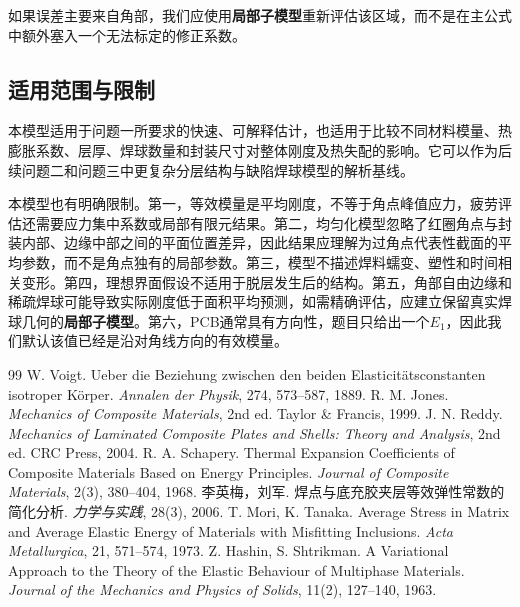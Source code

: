 \documentclass[draft,12pt,a4paper]{ctexart}
\theoremstyle{definition}
\begin{document}
如果误差主要来自角部，我们应使用\textbf{局部子模型}重新评估该区域，而不是在主公式中额外塞入一个无法标定的修正系数。

\subsection{适用范围与限制}

本模型适用于问题一所要求的快速、可解释估计，也适用于比较不同材料模量、热膨胀系数、层厚、焊球数量和封装尺寸对整体刚度及热失配的影响。它可以作为后续问题二和问题三中更复杂分层结构与缺陷焊球模型的解析基线。

本模型也有明确限制。第一，等效模量是平均刚度，不等于角点峰值应力，疲劳评估还需要应力集中系数或局部有限元结果。第二，均匀化模型忽略了红圈角点与封装内部、边缘中部之间的平面位置差异，因此结果应理解为过角点代表性截面的平均参数，而不是角点独有的局部参数。第三，模型不描述焊料蠕变、塑性和时间相关变形。第四，理想界面假设不适用于脱层发生后的结构。第五，角部自由边缘和稀疏焊球可能导致实际刚度低于面积平均预测，如需精确评估，应建立保留真实焊球几何的\textbf{局部子模型}。第六，PCB通常具有方向性，题目只给出一个$E_1$，因此我们默认该值已经是沿对角线方向的有效模量。

\newpage
{}
\begin{thebibliography}{99}
   W. Voigt. Ueber die Beziehung zwischen den beiden Elasticit\"atsconstanten isotroper K\"orper. \textit{Annalen der Physik}, 274, 573--587, 1889.
   R. M. Jones. \textit{Mechanics of Composite Materials}, 2nd ed. Taylor \& Francis, 1999.
   J. N. Reddy. \textit{Mechanics of Laminated Composite Plates and Shells: Theory and Analysis}, 2nd ed. CRC Press, 2004.
   R. A. Schapery. Thermal Expansion Coefficients of Composite Materials Based on Energy Principles. \textit{Journal of Composite Materials}, 2(3), 380--404, 1968.
   李英梅，刘军. 焊点与底充胶夹层等效弹性常数的简化分析. \textit{力学与实践}, 28(3), 2006.
   T. Mori, K. Tanaka. Average Stress in Matrix and Average Elastic Energy of Materials with Misfitting Inclusions. \textit{Acta Metallurgica}, 21, 571--574, 1973.
   Z. Hashin, S. Shtrikman. A Variational Approach to the Theory of the Elastic Behaviour of Multiphase Materials. \textit{Journal of the Mechanics and Physics of Solids}, 11(2), 127--140, 1963.
\end{thebibliography}
\end{document}
